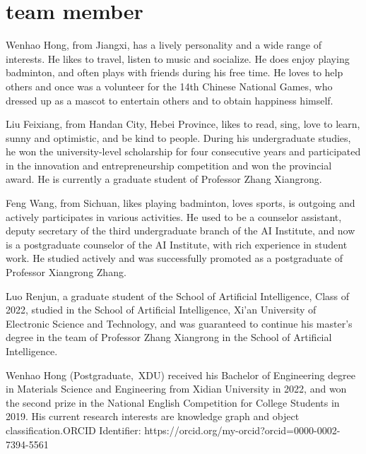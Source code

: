 \documentclass[journal]{IEEEtran}
\begin{document}
\section{team member}

Wenhao Hong, from Jiangxi, has a lively personality and a wide range of interests. He likes to travel, listen to music and socialize. He does enjoy playing badminton, and often plays with friends during his free time. He loves to help others and once was a volunteer for the 14th Chinese National Games, who dressed up as a mascot to entertain others and to obtain happiness himself.

Liu Feixiang, from Handan City, Hebei Province, likes to read, sing, love to learn, sunny and optimistic, and be kind to people. During his undergraduate studies, he won the university-level scholarship for four consecutive years and participated in the innovation and entrepreneurship competition and won the provincial award. He is currently a graduate student of Professor Zhang Xiangrong.

Feng Wang, from Sichuan, likes playing badminton, loves sports, is outgoing and actively participates in various activities. He used to be a counselor assistant, deputy secretary of the third undergraduate branch of the AI Institute, and now is a postgraduate counselor of the AI Institute, with rich experience in student work. He studied actively and was successfully promoted as a postgraduate of Professor Xiangrong Zhang. 

Luo Renjun, a graduate student of the School of Artificial Intelligence, Class of 2022, studied in the School of Artificial Intelligence, Xi'an University of Electronic Science and Technology, and was guaranteed to continue his master's degree in the team of Professor Zhang Xiangrong in the School of Artificial Intelligence.





\begin{IEEEbiography}{Wenhao Hong}
(Postgraduate,~XDU) received his Bachelor of Engineering degree in Materials Science and Engineering from Xidian University in 2022, and won the second prize in the National English Competition for College Students in 2019. His current research interests are knowledge graph and object classification.ORCID Identifier: https://orcid.org/my-orcid?orcid=0000-0002-7394-5561
\end{IEEEbiography}
\end{document}
